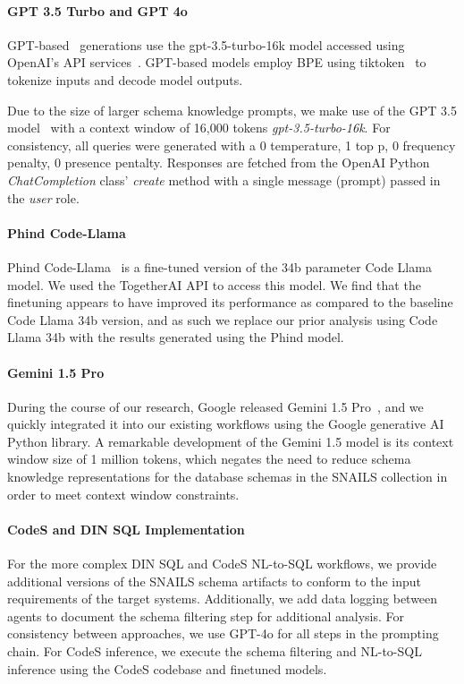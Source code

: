 \paragraph{GPT 3.5 Turbo and GPT 4o}
GPT-based~\cite{openai-chatgpt-blog-post} generations use the gpt-3.5-turbo-16k model accessed using OpenAI's API services~\cite{openai-api-documentation}. 
GPT-based models employ BPE using tiktoken~\cite{openai-tokenizer} to tokenize inputs and decode model outputs.

Due to the size of larger schema knowledge prompts, we make use of the GPT 3.5 model~\cite{openai-chatgpt-blog-post} with a context window of 16,000 tokens \emph{gpt-3.5-turbo-16k}.
For consistency, all queries were generated with a 0 temperature, 1 top p, 0 frequency penalty, 0 presence pentalty.
Responses are fetched from the OpenAI Python \emph{ChatCompletion} class' \emph{create} method with a single message (prompt) passed in the \emph{user} role. 

\paragraph{Phind Code-Llama}
Phind Code-Llama~\cite{phind2022phindcodellama} is a fine-tuned version of the 34b parameter Code Llama model.
We used the TogetherAI API to access this model.
We find that the finetuning appears to have improved its performance as compared to the baseline Code Llama 34b version, and as such we replace our prior analysis using Code Llama 34b with the results generated using the Phind model.

\paragraph{Gemini 1.5 Pro}
During the course of our research, Google released Gemini 1.5 Pro~\cite{geminiteam2024gemini15}, and we quickly integrated it into our existing workflows using the Google generative AI Python library.
A remarkable development of the Gemini 1.5 model is its context window size of 1 million tokens, which negates the need to reduce schema knowledge representations for the database schemas in the SNAILS collection in order to meet context window constraints.

\paragraph{\textbf{CodeS and DIN SQL Implementation}}
For the more complex DIN SQL and CodeS NL-to-SQL workflows, we provide additional versions of the SNAILS schema artifacts to conform to the input requirements of the target systems.
Additionally, we add data logging between agents to document the schema filtering step for additional analysis.
For consistency between approaches, we use GPT-4o for all steps in the prompting chain.
For CodeS inference, we execute the schema filtering and NL-to-SQL inference using the CodeS codebase and finetuned models.

